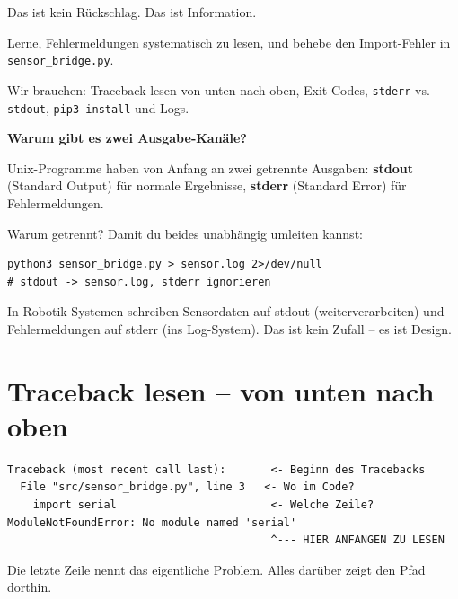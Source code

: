Das ist kein Rückschlag. Das ist Information.

\begin{aufgabeBox}
Lerne, Fehlermeldungen systematisch zu lesen, und behebe
den Import-Fehler in \texttt{sensor\_bridge.py}.
\end{aufgabeBox}

\begin{wissenBox}
Wir brauchen: Traceback lesen von unten nach oben,
Exit-Codes, \texttt{stderr} vs. \texttt{stdout},
\texttt{pip3 install} und Logs.
\end{wissenBox}

\begin{haubeBox}
\textbf{Warum gibt es zwei Ausgabe-Kanäle?}

Unix-Programme haben von Anfang an zwei getrennte Ausgaben:
\textbf{stdout} (Standard Output) für normale Ergebnisse,
\textbf{stderr} (Standard Error) für Fehlermeldungen.

Warum getrennt? Damit du beides unabhängig umleiten kannst:
\begin{lstlisting}[style=bash]
python3 sensor_bridge.py > sensor.log 2>/dev/null
# stdout -> sensor.log, stderr ignorieren
\end{lstlisting}
In Robotik-Systemen schreiben Sensordaten auf stdout
(weiterverarbeiten) und Fehlermeldungen auf stderr
(ins Log-System). Das ist kein Zufall -- es ist Design.
\end{haubeBox}

\section{Traceback lesen -- von unten nach oben}

\begin{lstlisting}[style=text]
Traceback (most recent call last):       <- Beginn des Tracebacks
  File "src/sensor_bridge.py", line 3   <- Wo im Code?
    import serial                        <- Welche Zeile?
ModuleNotFoundError: No module named 'serial'
                                         ^--- HIER ANFANGEN ZU LESEN
\end{lstlisting}

Die letzte Zeile nennt das eigentliche Problem.
Alles darüber zeigt den Pfad dorthin.

